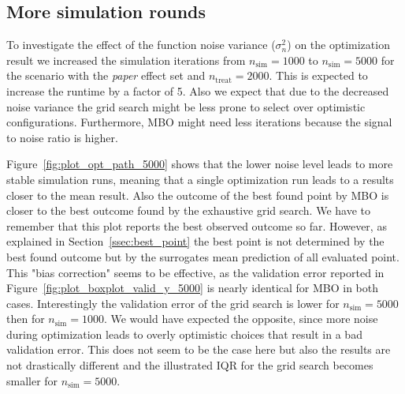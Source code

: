 \documentclass[bimj,fleqn]{w-art}
\theoremstyle{plain}
\theoremstyle{definition}
\begin{document}
\subsection{More simulation rounds}

To investigate the effect of the function noise variance ($\sigma^2_n$) on the optimization result we increased the simulation iterations from $n_\text{sim} = 1000$ to $n_\text{sim} = 5000$ for the scenario with the \emph{paper} effect set and  $n_{\text{treat}} = 2000$.
This is expected to increase the runtime by a factor of 5.
Also we expect that due to the decreased noise variance the grid search might be less prone to select over optimistic configurations.
Furthermore, MBO might need less iterations because the signal to noise ratio is higher.

Figure~\ref{fig:plot_opt_path_5000} shows that the lower noise level leads to more stable simulation runs, meaning that a single optimization run leads to a results closer to the mean result.
Also the outcome of the best found point by MBO is closer to the best outcome found by the exhaustive grid search.
We have to remember that this plot reports the best observed outcome so far. 
However, as explained in Section~\ref{ssec:best_point} the best point is not determined by the best found outcome but by the surrogates mean prediction of all evaluated point.
This "bias correction" seems to be effective, as the validation error reported in Figure~\ref{fig:plot_boxplot_valid_y_5000} is nearly identical for MBO in both cases.
Interestingly the validation error of the grid search is lower for $n_\text{sim} = 5000$ then for $n_\text{sim} = 1000$.
We would have expected the opposite, since more noise during optimization leads to overly optimistic choices that result in a bad validation error.
This does not seem to be the case here but also the results are not drastically different and the illustrated IQR for the grid search becomes smaller for $n_\text{sim} = 5000$.

\end{document}
